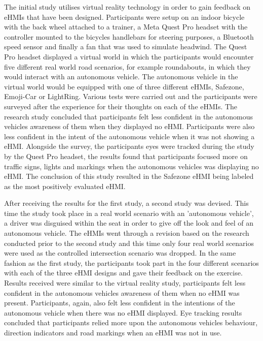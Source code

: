 \documentclass{l4proj}
\begin{document}
The initial study utilises virtual reality technology in order to gain feedback on eHMIs that have been designed. Participants were setup on an indoor bicycle with the back wheel attached to a trainer, a Meta Quest Pro headset with the controller mounted to the bicycles handlebars for steering purposes, a Bluetooth speed sensor and finally a fan that was used to simulate headwind. The Quest Pro headset displayed a virtual world in which the participants would encounter five different real world road scenarios, for example roundabouts, in which they would interact with an autonomous vehicle. The autonomous vehicle in the virtual world would be equipped with one of three different eHMIs, Safezone, Emoji-Car or LightRing. Various tests were carried out and the participants were surveyed after the experience for their thoughts on each of the eHMIs. The research study concluded that participants felt less confident in the autonomous vehicles awareness of them when they displayed no eHMI. Participants were also less confident in the intent of the autonomous vehicle when it was not showing a eHMI. Alongside the survey, the participants eyes were tracked during the study by the Quest Pro headset, the results found that participants focused more on traffic signs, lights and markings when the autonomous vehicles was displaying no eHMI. The conclusion of this study resulted in the Safezone eHMI being labeled as the most positively evaluated eHMI.

After receiving the results for the first study, a second study was devised. This time the study took place in a real world scenario with an 'autonomous vehicle', a driver was disguised within the seat in order to give off the look and feel of an autonomous vehicle. The eHMIs went through a revision based on the research conducted prior to the second study and this time only four real world scenarios were used as the controlled intersection scenario was dropped. In the same fashion as the first study, the participants took part in the four different scenarios with each of the three eHMI designs and gave their feedback on the exercise. Results received were similar to the virtual reality study, participants felt less confident in the autonomous vehicles awareness of them when no eHMI was present. Participants, again, also felt less confident in the intentions of the autonomous vehicle when there was no eHMI displayed. Eye tracking results concluded that participants relied more upon the autonomous vehicles behaviour, direction indicators and road markings when an eHMI was not in use.
\end{document}
